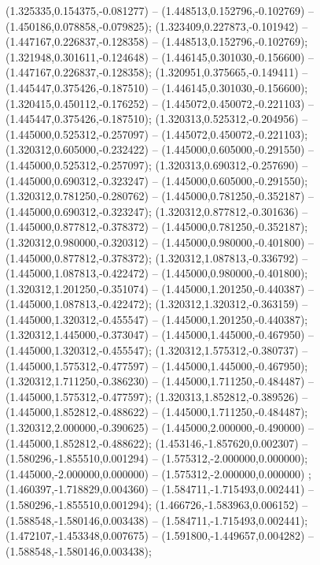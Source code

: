  (1.325335,0.154375,-0.081277) -- (1.448513,0.152796,-0.102769) -- (1.450186,0.078858,-0.079825);
 (1.323409,0.227873,-0.101942) -- (1.447167,0.226837,-0.128358) -- (1.448513,0.152796,-0.102769);
 (1.321948,0.301611,-0.124648) -- (1.446145,0.301030,-0.156600) -- (1.447167,0.226837,-0.128358);
 (1.320951,0.375665,-0.149411) -- (1.445447,0.375426,-0.187510) -- (1.446145,0.301030,-0.156600);
 (1.320415,0.450112,-0.176252) -- (1.445072,0.450072,-0.221103) -- (1.445447,0.375426,-0.187510);
 (1.320313,0.525312,-0.204956) -- (1.445000,0.525312,-0.257097) -- (1.445072,0.450072,-0.221103);
 (1.320312,0.605000,-0.232422) -- (1.445000,0.605000,-0.291550) -- (1.445000,0.525312,-0.257097);
 (1.320313,0.690312,-0.257690) -- (1.445000,0.690312,-0.323247) -- (1.445000,0.605000,-0.291550);
 (1.320312,0.781250,-0.280762) -- (1.445000,0.781250,-0.352187) -- (1.445000,0.690312,-0.323247);
 (1.320312,0.877812,-0.301636) -- (1.445000,0.877812,-0.378372) -- (1.445000,0.781250,-0.352187);
 (1.320312,0.980000,-0.320312) -- (1.445000,0.980000,-0.401800) -- (1.445000,0.877812,-0.378372);
 (1.320312,1.087813,-0.336792) -- (1.445000,1.087813,-0.422472) -- (1.445000,0.980000,-0.401800);
 (1.320312,1.201250,-0.351074) -- (1.445000,1.201250,-0.440387) -- (1.445000,1.087813,-0.422472);
 (1.320312,1.320312,-0.363159) -- (1.445000,1.320312,-0.455547) -- (1.445000,1.201250,-0.440387);
 (1.320312,1.445000,-0.373047) -- (1.445000,1.445000,-0.467950) -- (1.445000,1.320312,-0.455547);
 (1.320312,1.575312,-0.380737) -- (1.445000,1.575312,-0.477597) -- (1.445000,1.445000,-0.467950);
 (1.320312,1.711250,-0.386230) -- (1.445000,1.711250,-0.484487) -- (1.445000,1.575312,-0.477597);
 (1.320313,1.852812,-0.389526) -- (1.445000,1.852812,-0.488622) -- (1.445000,1.711250,-0.484487);
 (1.320312,2.000000,-0.390625) -- (1.445000,2.000000,-0.490000) -- (1.445000,1.852812,-0.488622);
 (1.453146,-1.857620,0.002307) -- (1.580296,-1.855510,0.001294) -- (1.575312,-2.000000,0.000000);
 (1.445000,-2.000000,0.000000) -- (1.575312,-2.000000,0.000000) ;
 (1.460397,-1.718829,0.004360) -- (1.584711,-1.715493,0.002441) -- (1.580296,-1.855510,0.001294);
 (1.466726,-1.583963,0.006152) -- (1.588548,-1.580146,0.003438) -- (1.584711,-1.715493,0.002441);
 (1.472107,-1.453348,0.007675) -- (1.591800,-1.449657,0.004282) -- (1.588548,-1.580146,0.003438);
